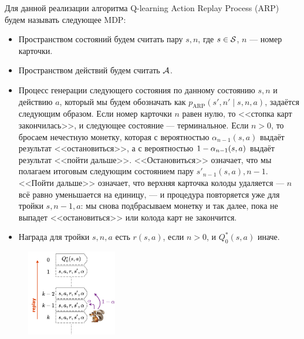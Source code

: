 \newcommand{\ARP}{\mathrm{ARP}}
\begin{definition}
Для данной реализации алгоритма Q-learning Action Replay Process (ARP) будем называть следующее MDP:
\begin{itemize}
    \item Пространством состояний будем считать пару $s, n$, где $s \in \mathcal{S}$, $n$ --- номер карточки.
    \item Пространством действий будем считать $\mathcal{A}$.
    \item Процесс генерации следующего состояния по данному состоянию $s, n$ и действию $a$, который мы будем обозначать как $p_{\ARP}(s', n' \mid s, n, a)$, задаётся следующим образом. Если номер карточки $n$ равен нулю, то <<стопка карт закончилась>>, и следующее состояние --- терминальное. Если $n > 0$, то бросаем нечестную монетку, которая с вероятностью $\alpha_{n - 1}(s, a)$ выдаёт результат <<остановиться>>, а с вероятностью $1 \HM- \alpha_{n - 1}(s, a)$ выдаёт результат <<пойти дальше>>. <<Остановиться>> означает, что мы полагаем итоговым следующим состоянием пару $s'_{n - 1}(s, a), n - 1$. <<Пойти дальше>> означает, что верхняя карточка колоды удаляется --- $n$ всё равно уменьшается на единицу, --- и процедура повторяется уже для тройки $s, n - 1, a$: мы снова подбрасываем монетку и так далее, пока не выпадет <<остановиться>> или колода карт не закончится.
    \item Награда для тройки $s, n, a$ есть $r(s, a)$, если $n > 0$, и $Q_0^*(s, a)$ иначе.
\end{itemize}
\end{definition}

\begin{figure}
\vspace{-0.3cm}
\centering
\includegraphics[width=0.35\textwidth]{Images/ARP.png}
\end{figure}

